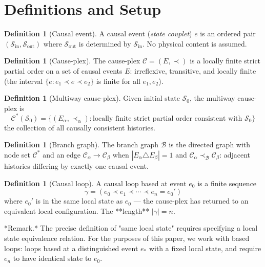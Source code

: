 \documentclass[11pt]{article}
\theoremstyle{definition}
\newtheorem{definition}[theorem]{Definition}
\theoremstyle{remark}
\begin{document}
\medskip

\section{Definitions and Setup}\label{definitions-and-setup}

\begin{definition}[Causal event]
\label{definition:2-1}
A causal event (\emph{state couplet}) $e$ is an ordered pair $(\mathcal{S}_{\mathrm{in}}, \mathcal{S}_{\mathrm{out}})$ where $\mathcal{S}_{\mathrm{out}}$ is determined by $\mathcal{S}_{\mathrm{in}}$. No physical content is assumed.

\end{definition}

\begin{definition}[Cause-plex]
\label{definition:2-2}
The cause-plex $\mathcal{C} = (E, \prec)$ is a locally finite strict partial order on a set of causal events $E$: irreflexive, transitive, and locally finite (the interval $\{e : e_1 \prec e \prec e_2\}$ is finite for all $e_1, e_2$).

\end{definition}

\begin{definition}[Multiway cause-plex]
\label{definition:2-3}
Given initial state $\mathcal{S}_0$, the multiway cause-plex is
$$\mathcal{C}^{\ast}(\mathcal{S}_0) = \{(E_\alpha, \prec_\alpha) : \text{locally finite strict partial order consistent with } \mathcal{S}_0\}$$
the collection of all causally consistent histories.

\end{definition}

\begin{definition}[Branch graph]
\label{definition:2-4}
The branch graph $\mathcal{B}$ is the directed graph with node set $\mathcal{C}^{\ast}$ and an edge $\mathcal{C}_\alpha \to \mathcal{C}_\beta$ when $|E_\alpha \triangle E_\beta| = 1$ and $\mathcal{C}_\alpha \prec_{\mathcal{B}} \mathcal{C}_\beta$: adjacent histories differing by exactly one causal event.

\end{definition}

\begin{definition}[Causal loop]
\label{definition:2-5}
A causal loop based at event $e_0$ is a finite sequence
$$\gamma = (e_0 \prec e_1 \prec \cdots \prec e_n = e_0')$$
where $e_0'$ is in the same local state as $e_0$ — the cause-plex has returned to an equivalent local configuration. The **length** $|\gamma| = n$.

*Remark.* The precise definition of "same local state" requires specifying a local state equivalence relation. For the purposes of this paper, we work with based loops: loops based at a distinguished event $e_{\ast}$ with a fixed local state, and require $e_n$ to have identical state to $e_0$.

\end{definition}
\end{document}
